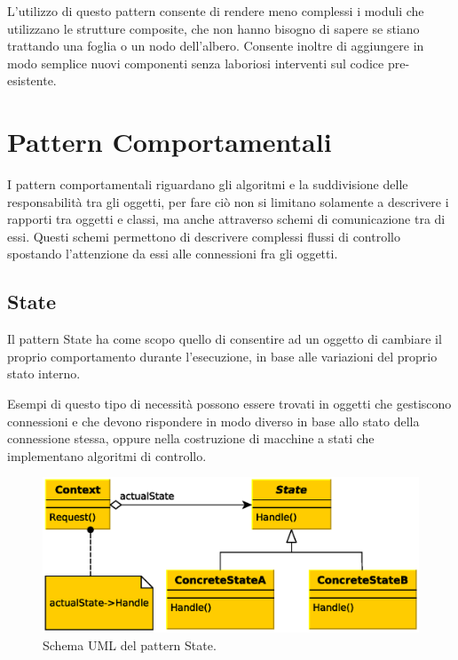 L'utilizzo di questo pattern consente di rendere meno complessi i moduli che utilizzano le strutture composite, che non hanno bisogno di sapere se stiano trattando una foglia o un nodo dell'albero. Consente inoltre di aggiungere in modo semplice nuovi componenti senza laboriosi interventi sul codice pre-esistente.


\section{Pattern Comportamentali}
I pattern comportamentali riguardano gli algoritmi e la suddivisione delle responsabilit\`a tra gli oggetti, per fare ci\`o non si limitano solamente a descrivere i rapporti tra oggetti e classi, ma anche attraverso schemi di comunicazione tra di essi. Questi schemi permettono di descrivere complessi flussi di controllo spostando l'attenzione da essi alle connessioni fra gli oggetti.

\subsection{State}
\label{sub:state}
Il pattern State ha come scopo quello di consentire ad un oggetto di cambiare il proprio comportamento durante l'esecuzione, in base alle variazioni del proprio stato interno.

Esempi di questo tipo di necessit\`a possono essere trovati in oggetti che gestiscono connessioni e che devono rispondere in modo diverso in base allo stato della connessione stessa, oppure nella costruzione di macchine a stati che implementano algoritmi di controllo.

\begin{figure}
\begin{center}
\includegraphics[width=12cm]{Immagini/StatePattern}
\caption{Schema UML del pattern State.\label{f:statepattern}} 
\end{center} 
\end{figure}


